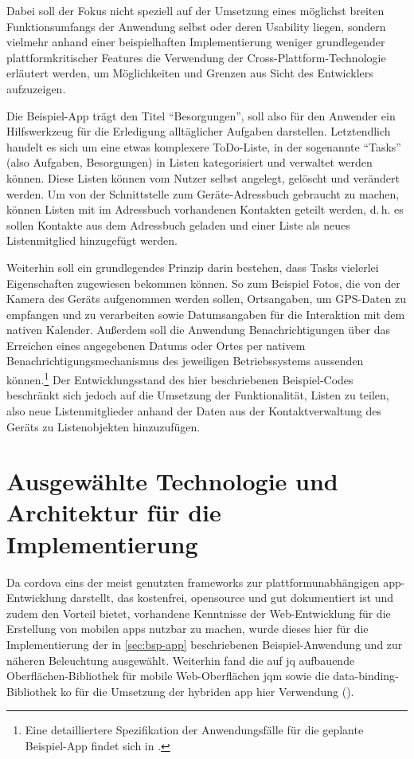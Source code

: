 Dabei soll der Fokus nicht speziell auf der Umsetzung eines möglichst breiten Funktionsumfangs der Anwendung selbst oder deren Usability liegen, sondern vielmehr anhand einer beispielhaften Implementierung weniger grundlegender plattformkritischer Features die Verwendung der Cross-Plattform-Technologie erläutert werden, um Möglichkeiten und Grenzen aus Sicht des Entwicklers aufzuzeigen.

Die Beispiel-App trägt den Titel \enquote{Besorgungen}, soll also für den Anwender ein Hilfswerkzeug für die Erledigung alltäglicher Aufgaben darstellen.
Letztendlich handelt es sich um eine etwas komplexere ToDo-Liste, in der sogenannte \enquote{Tasks} (also Aufgaben, Besorgungen) in Listen kategorisiert und verwaltet werden können.
Diese Listen können vom Nutzer selbst angelegt, gelöscht und verändert werden.
Um von der Schnittstelle zum Geräte-Adressbuch gebraucht zu machen, können Listen mit im Adressbuch vorhandenen Kontakten geteilt werden, d.\,h. es sollen Kontakte aus dem Adressbuch geladen und einer Liste als neues Listenmitglied hinzugefügt werden.

Weiterhin soll ein grundlegendes Prinzip darin bestehen, dass Tasks vielerlei Eigenschaften zugewiesen bekommen können.
So zum Beispiel Fotos, die von der Kamera des Geräts aufgenommen werden sollen, Ortsangaben, um GPS-Daten zu empfangen und zu verarbeiten sowie Datumsangaben für die Interaktion mit dem nativen Kalender.
Außerdem soll die Anwendung Benachrichtigungen über das Erreichen eines angegebenen Datums oder Ortes per nativem Benachrichtigungsmechanismus des jeweiligen Betriebssystems aussenden können.\footnote{Eine detailliertere Spezifikation der Anwendungsfälle für die geplante Beispiel-App findet sich in .}
Der Entwicklungsstand des hier beschriebenen Beispiel-Codes beschränkt sich jedoch auf die Umsetzung der \og Funktionalität, Listen zu teilen, also neue Listenmitglieder anhand der Daten aus der Kontaktverwaltung des Geräts zu Listenobjekten hinzuzufügen.

\section{Ausgewählte Technologie und Architektur für die Implementierung}

Da \gls{cordova} eins der meist genutzten \glspl{framework} zur plattformunabhängigen \gls{app}-Entwicklung darstellt, das kostenfrei, \gls{opensource} und gut dokumentiert ist und zudem den Vorteil bietet, vorhandene Kenntnisse der Web-Entwicklung für die Erstellung von mobilen \glspl{app} nutzbar zu machen, wurde dieses hier für die Implementierung der in \autoref{sec:bsp-app} beschriebenen Beispiel-Anwendung und zur näheren Beleuchtung ausgewählt.
Weiterhin fand die auf \gls{jq} aufbauende Oberflächen-Bibliothek für mobile Web-Oberflächen \gls{jqm} sowie die \gls{data-binding}-Bibliothek \gls{ko} für die Umsetzung der hybriden \gls{app} hier Verwendung ().


